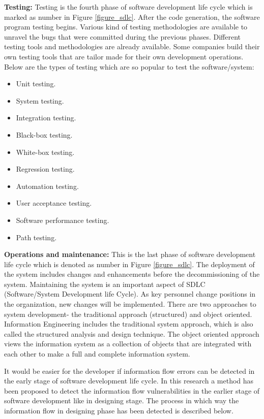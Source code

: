 \textbf{ Testing:}
Testing is the fourth phase of software development life cycle which is marked as number  in Figure \ref{figure_sdlc}. After the code generation, the software program testing begins. Various kind of testing methodologies are available to unravel the bugs that were committed during the previous phases. Different testing tools and methodologies are already available. Some companies build their own testing tools that are tailor made for their own development operations. Below are the types of testing which are so popular to test the software/system:
\begin{itemize}
	\item Unit testing.
    \item System testing.
	\item Integration testing.
	\item Black-box testing.
	\item White-box testing.
	\item Regression testing.
	\item Automation testing.
	\item User acceptance testing.
	\item Software performance testing.
	\item Path testing.
\end{itemize}

\textbf{ Operations and maintenance:}
This is the last phase of software development life cycle which is denoted as number  in Figure \ref{figure_sdlc}. The deployment of the system includes changes and enhancements before the decommissioning of the system. Maintaining the system is an important aspect of SDLC (Software/System Development life Cycle). As key personnel change positions in the organization, new changes will be implemented. There are two approaches to system development- the traditional approach (structured) and object oriented. Information Engineering includes the traditional system approach, which is also called the structured analysis and design technique. The object oriented approach views the information system as a collection of objects that are integrated with each other to make a full and complete information system.

It would be easier for the developer if information flow errors can be detected in the early stage of software development life cycle. In this research a method has been proposed to detect the information flow vulnerabilities in the earlier stage of software development like in designing stage. The process in which way the information flow in designing phase has been detected is described below.

